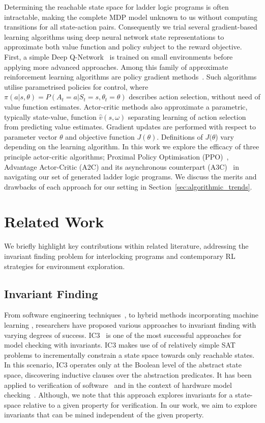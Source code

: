 \documentclass[runningheads]{llncs}
\begin{document}
Determining the reachable state space for ladder logic programs is often intractable, making the complete MDP model unknown to us without computing transitions for all state-action pairs. Consequently we trial several gradient-based learning algorithms using deep neural network state representations to approximate both value function and policy subject to the reward objective. First, a simple Deep Q-Network~\cite{mnih2013playing} is trained on small environments before applying more advanced approaches. Among this family of approximate reinforcement learning algorithms are policy gradient methods~\cite{kakade2001natural}. Such algorithms utilise parametrised policies for control, where $\pi(a|s,\theta) = P(A_t=a|S_t=s,\theta_t=\theta)$ describes action selection, without need of value function estimates. Actor-critic methods also approximate a parametric, typically state-value, function $\hat{v}(s,\omega)$ separating learning of action selection from predicting value estimates. Gradient updates are performed with respect to parameter vector $\theta$ and objective function $J(\theta)$. Definitions of $J(\theta$) vary depending on the learning algorithm.  In this work we explore the efficacy of three principle actor-critic algorithms; Proximal Policy Optimisation (PPO)~\cite{schulman2017proximal}, Advantage Actor-Critic (A2C) and its asynchronous counterpart (A3C)~\cite{mnih2016asynchronous} in navigating our set of generated ladder logic programs. We discuss the merits and drawbacks of each approach for our setting in Section~\ref{sec:algorithmic_trends}.

\section{Related Work}
We briefly highlight key contributions within related literature, addressing the invariant finding problem for interlocking programs and contemporary RL strategies for environment exploration.

\subsection{Invariant Finding}

From software engineering techniques~\cite{case2007automated, bensalem1996powerful}, to hybrid methods incorporating machine learning \cite{garg2016learning}, researchers have proposed various approaches to invariant finding with varying degrees of success. 
IC3~\cite{bradley11} is one of the most successful approaches for model checking with invariants. IC3 makes use of of relatively simple SAT problems to incrementally constrain a state space towards only reachable states. In this scenario, IC3 operates only at the Boolean level of the abstract state space, discovering inductive clauses over the abstraction predicates. It has been applied to verification of software~\cite{cimatti12} and in the context of hardware model checking~\cite{bradley07}. Although, we note that this approach explores invariants for a state-space relative to a given property for verification. In our work, we aim to explore invariants that can be mined independent of the given property.
\end{document}
